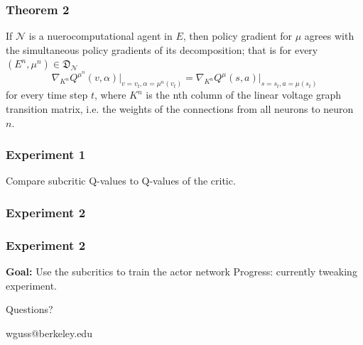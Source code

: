 \documentclass{beamer}
\numberwithin{equation}{subsection}
\numberwithin{theorem}{subsection}
\def\scriptn{{\mathcal N}}
\begin{document}
\begin{frame}
    \frametitle{Theorem 2}
    \begin{theorem}
        If $\scriptn$ is a nuerocomputational agent in $E$, then policy gradient for $\mu$ agrees with the simultaneous policy gradients of its decomposition; that is for every $(E^n, \mu^n) \in \mathfrak{D}_\scriptn$
        \begin{equation}
            \nabla_{K^n} Q^{\mu^n}(v,\alpha)\Big|_{v=v_t,\alpha=\mu^n(v_t)} =\nabla_{K^n} Q^{\mu}(s,a)\Big|_{s=s_t,a=\mu(s_t)}
        \end{equation}
        for every time step $t$, where $K^n$ is the nth column of the linear voltage graph transition matrix, i.e. the weights of the connections from all neurons to neuron $n.$
    \end{theorem}
\end{frame}
\begin{frame}
    \frametitle{Experiment 1}
    Compare subcritic Q-values to Q-values of the critic.
\end{frame}
\begin{frame}
    \frametitle{Experiment 2}
\end{frame}
\begin{frame}
    \frametitle{Experiment 2}
    \textbf{Goal:} Use the subcritics to train the actor network
    Progress: currently tweaking experiment.
\end{frame}

\begin{frame}
\Huge{\centerline{Questions?}}
\Small\centerline{wguss@berkeley.edu}
\end{frame}

\end{document}
